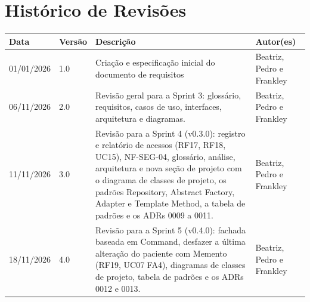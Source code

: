 \section*{Histórico de Revisões}
\begin{table}[H]
  \centering
  \begin{tabular}{|p{2.5cm}|p{1.5cm}|p{7cm}|p{4cm}|}
    \hline
    \textbf{Data} & \textbf{Versão} & \textbf{Descrição} & \textbf{Autor(es)} \\
    \hline
    01/01/2026 & 1.0 & Criação e especificação inicial do documento de requisitos & Beatriz, Pedro e Frankley \\
    \hline
    06/11/2026 & 2.0 & Revisão geral para a Sprint 3: glossário, requisitos, casos de uso, interfaces, arquitetura e diagramas. & Beatriz, Pedro e Frankley \\
    \hline
    11/11/2026 & 3.0 & Revisão para a Sprint 4 (v0.3.0): registro e relatório de acessos (RF17, RF18, UC15), NF-SEG-04, glossário, análise, arquitetura e nova seção de projeto com o diagrama de classes de projeto, os padrões Repository, Abstract Factory, Adapter e Template Method, a tabela de padrões e os ADRs 0009 a 0011. & Beatriz, Pedro e Frankley \\
    \hline
    18/11/2026 & 4.0 & Revisão para a Sprint 5 (v0.4.0): fachada baseada em Command, desfazer a última alteração do paciente com Memento (RF19, UC07 FA4), diagramas de classes de projeto, tabela de padrões e os ADRs 0012 e 0013. & Beatriz, Pedro e Frankley \\
    \hline
  \end{tabular}
\end{table}

